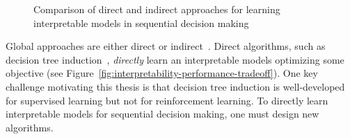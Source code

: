 \begin{figure}[htbp]
    \caption{Comparison of direct and indirect approaches for learning interpretable models in sequential decision making}
    \label{fig:direct-vs-indirect-methods}
\end{figure}

Global approaches are either direct or indirect~\cite{milani-survey}. 
Direct algorithms, such as decision tree induction~\cite{breiman1984classification}, \textit{directly} learn an interpretable models optimizing some objective (see Figure~\ref{fig:interpretability-performance-tradeoff}).
One key challenge motivating this thesis is that decision tree induction is well-developed for supervised learning but not for reinforcement learning.
To directly learn interpretable models for sequential decision making, one must design new algorithms. 

